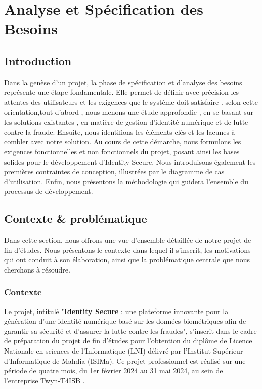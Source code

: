 \chapter{Analyse et Spécification des Besoins}





\section*{Introduction}

Dans la genèse d'un projet, la phase de spécification et d'analyse des besoins représente
une étape fondamentale. Elle permet de définir avec précision les attentes des utilisateurs et les exigences que le système doit satisfaire . selon cette orientation,tout d'abord , nous menons une étude approfondie , en se basant sur les solutions existantes , en matière de gestion d'identité numérique et de lutte contre la fraude. Ensuite, nous identifions les éléments clés et les lacunes à combler avec notre solution. Au cours de cette démarche, nous formulons les exigences fonctionnelles et non fonctionnels du projet, posant ainsi les bases solides pour le développement d'Identity Secure. Nous introduisons également les premières contraintes de conception, illustrées par le diagramme de cas d'utilisation. Enfin, nous présentons la méthodologie qui guidera l'ensemble du processus de développement.
\section*{Contexte \& problématique}

Dans cette section, nous offrons une vue d'ensemble détaillée de notre projet de fin d'études. Nous présentons le contexte dans lequel il s'inscrit, les motivations qui ont conduit à son élaboration, ainsi que la problématique centrale que nous cherchons à résoudre.

\subsection{Contexte}
Le projet, intitulé "\textbf{Identity Secure} :  une plateforme innovante pour la génération d'une identité numérique basé sur les données biométriques afin de garantir sa sécurité et d'assurer la lutte contre les fraudes", s'inscrit dans le cadre de préparation du projet de fin d'études pour l'obtention du diplôme de Licence Nationale en sciences de l'Informatique (LNI) délivré par l'Institut Supérieur d'Informatique de Mahdia (ISIMa). Ce projet professionnel est réalisé sur une période de quatre mois, du 1er février 2024 au 31 mai 2024, au sein de l'entreprise Twyn-T4ISB \cite{b1}.

